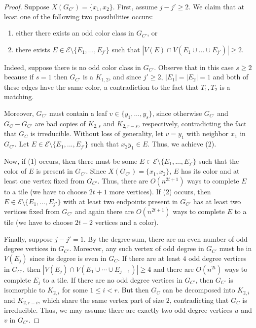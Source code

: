 \documentclass{article}
\theoremstyle{definition}
\begin{document}
\begin{proof}
Suppose $X(G_{C'})=\{x_1,x_2\}$. 
First, assume $j-j'\geq 2$.
We claim that at least one of the following two possibilities occurs:
\begin{enumerate}
    \item[(1)] either there exists an odd color class in $G_{C'}$, or
    \item[(2)] there exists  $E\in \mathcal{E}\setminus \{E_1,...,E_{j'}\}$ such that $|V(E) \cap  V(E_1\cup...\cup E_{j'})| \ge 2$.
\end{enumerate}
Indeed, suppose there is no odd color class in $G_{C'}$. Observe that in this case $s\ge 2$ because if $s=1$ then  $G_{C'}$ is a $K_{1,2}$, and since $j'\geq 2$, $|E_1|=|E_2|=1$ and both of these edges have the same color, a contradiction to the fact that ${T_1,T_2}$ is a matching.

Moreover, $G_{C'}$ must contain a leaf $v \in \{y_1, \dots, y_s\}$, since otherwise $G_{C'}$ and $G_C - G_{C'}$ are  bad copies of $K_{2,s}$ and $K_{2,r-s}$, respectively, contradicting the fact that  $G_C$ is irreducible. Without loss of generality, let $v = y_1$ with neighbor $x_1$ in $G_{C'}$. Let $E\in \mathcal{E}\setminus \{E_1,...,E_{j'}\}$ such that $x_2y_1\in E$. Thus, we achieve (2).

Now, if (1) occurs, then there must be some $E\in \mathcal{E}\setminus \{E_1,...,E_{j'}\}$ such that the color of $E$  is present in $G_{C'}$. Since $X(G_{C'})=\{x_1,x_2\}$, $E$ has its color and at least one vertex fixed from $G_{C'}$. Thus, there are $O(n^{2t+1})$ ways to complete $E$ to a tile (we have to choose $2t+1$ more vertices). If (2) occurs, then $E\in \mathcal{E}\setminus \{E_1,...,E_{j'}\}$ with at least two endpoints present in $G_{C'}$ has at least two vertices fixed from $G_{C'}$ and again there are $O(n^{2t+1})$ ways to complete $E$ to a tile (we have to choose $2t-2$ vertices and a color).

Finally, suppose $j-j' =1$. By the degree-sum, there are an even number of odd degree vertices in $G_{C'}$. Moreover, any such vertex of odd degree in $G_{C'}$ must be in $V(E_j)$ since its degree is even in $G_{C}$. If there are at least $4$ odd degree vertices in $G_{C'}$, then $|V(E_j)\cap V(E_1 \cup \cdots \cup E_{j-1})|\geq 4$ and there are $O(n^{2t})$ ways to complete $E_j$ to a tile. If there are no odd degree vertices in $G_{C'}$, then $G_{C'}$ is isomorphic to $K_{2,i}$ for some $1 \leq i < r$. But then $G_C$ can be decomposed into $K_{2,i}$ and $K_{2,r-i}$, which share the same vertex part of size $2$, contradicting that $G_C$ is irreducible. Thus, we may assume there are exactly two odd degree vertices $u$ and $v$ in $G_{C'}$.


\end{proof}
\end{document}
